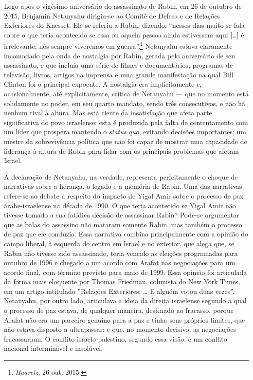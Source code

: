 Logo após o vigésimo aniversário do assassinato de Rabin, em 26 de
outubro de 2015, Benjamin Netanyahu dirigiu-se ao Comitê de Defesa e de
Relações Exteriores do Knesset. Ele se referiu a Rabin, dizendo:
``nesses dias muito se fala sobre o que teria acontecido se essa ou
aquela pessoa ainda estivessem aqui {[}\ldots{}{]} é irrelevante; nós sempre
viveremos em guerra''.\footnote{\emph{Haaretz}, 26 out. 2015.} Netanyahu estava claramente incomodado
pela onda de nostalgia por Rabin, gerada pelo aniversário de seu
assassinato, e que incluía uma série de filmes e documentários, programas
de televisão, livros, artigos na imprensa e uma grande manifestação na
qual Bill Clinton foi o principal expoente. A nostalgia era
implicitamente e, ocasionalmente, até explicitamente, crítica de
Netanyahu --- que no momento está solidamente no poder, em seu quarto
mandato, sendo três consecutivos, e não há nenhum rival à altura. Mas
está ciente da insatisfação que afeta parte significativa do povo
israelense: esta é produzida pela falta de contentamento com um líder
que prospera mantendo o \emph{status quo}, evitando decisões importantes;
um mestre da sobrevivência política que não foi capaz de mostrar uma
capacidade de liderança à altura de Rabin para lidar com os principais
problemas que afetam Israel.

A declaração de Netanyahu, na verdade, representa perfeitamente o choque
de narrativas sobre a herança, o legado e a memória de Rabin. Uma das
narrativas refere-se ao debate a respeito do impacto de Yigal Amir sobre
o processo de paz árabe-israelense na década de 1990. O que teria
acontecido se Yigal Amir não tivesse tomado a sua fatídica decisão de
assassinar Rabin? Pode-se argumentar que as balas do assassino não
mataram somente Rabin, mas também o processo de paz que ele conduzia.
Essa narrativa combina principalmente com a opinião do campo liberal, à
esquerda do centro em Israel e no exterior, que alega que, se Rabin não
tivesse sido assassinado, teria vencido as eleições programadas para
outubro de 1996 e chegado a um acordo com Arafat nas negociações para um
acordo final, com término previsto para maio de 1999. Essa opinião foi
articulada da forma mais eloquente por Thomas Friedman, colunista do New
York Times, em um artigo intitulado ''Relações Exteriores; \ldots{} E alguém
votou duas vezes''. Netanyahu, por outro lado, articulava a ideia da
direita israelense segundo a qual o processo de paz estava, de qualquer
maneira, destinado ao fracasso, porque Arafat não era um parceiro genuíno
para a paz e tinha seus próprios limites, que não estava disposto a
ultrapassar; e que, no momento decisivo, as negociações fracassariam. O
conflito israelo-palestino, segundo essa visão, é um conflito nacional
interminável e insolúvel.

